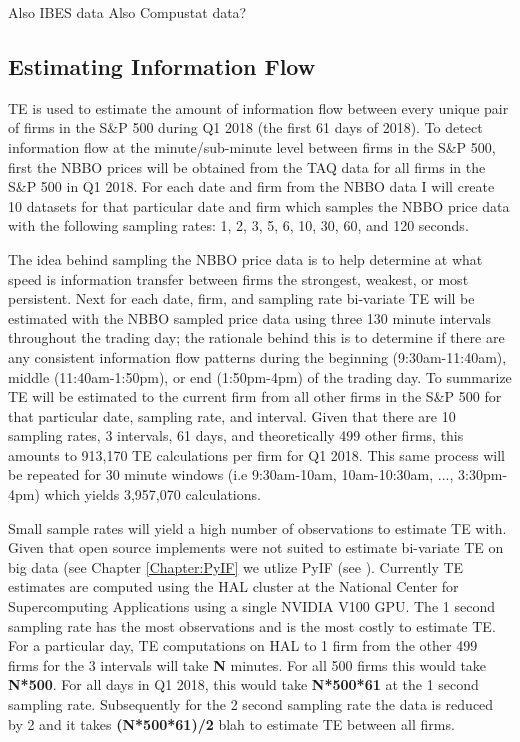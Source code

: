 Also IBES data
Also Compustat data?

\subsection{Estimating Information Flow}

TE is used to estimate the amount of information flow between every unique pair of firms in the S\&P 500 during Q1 2018 (the first 61 days of 2018). To detect information flow at the minute/sub-minute level between firms in the S\&P 500, first the NBBO prices will be obtained from the TAQ data for all firms in the S\&P 500 in Q1 2018. For each date and firm from the NBBO data I will create 10 datasets for that particular date and firm which samples the NBBO price data with the following sampling rates: 1, 2, 3, 5, 6, 10, 30, 60, and 120 seconds.

The idea behind sampling the NBBO price data is to help determine at what speed is information transfer between firms the strongest, weakest, or most persistent. Next for each date, firm, and sampling rate bi-variate TE will be estimated with the NBBO sampled price data using three 130 minute intervals throughout the trading day; the rationale behind this is to determine if there are any consistent information flow patterns during the beginning (9:30am-11:40am), middle (11:40am-1:50pm), or end (1:50pm-4pm) of the trading day. To summarize TE will be estimated to the current firm from all other firms in the S\&P 500 for that particular date, sampling rate, and interval. Given that there are 10 sampling rates, 3 intervals, 61 days, and theoretically 499 other firms, this amounts to 913,170 TE calculations per firm for Q1 2018. This same process will be repeated for 30 minute windows (i.e 9:30am-10am, 10am-10:30am, ..., 3:30pm-4pm) which yields 3,957,070 calculations. 

Small sample rates will yield a high number of observations to estimate TE with. Given that open source implements were not suited to estimate bi-variate TE on big data (see Chapter \ref{Chapter:PyIF} we utlize PyIF (see \cite{PyIF}). Currently TE estimates are computed using the HAL cluster at the National Center for Supercomputing Applications using a single NVIDIA V100 GPU. The 1 second sampling rate has the most observations and is the most costly to estimate TE. For a particular day, TE computations on HAL to 1 firm from the other 499 firms for the 3 intervals will take \textbf{N} minutes. For all 500 firms this would take \textbf{N*500}. For all days in Q1 2018, this would take \textbf{N*500*61} at the 1 second sampling rate. Subsequently for the 2 second sampling rate the data is reduced by 2 and it takes \textbf{(N*500*61)/2} blah to estimate TE between all firms.

